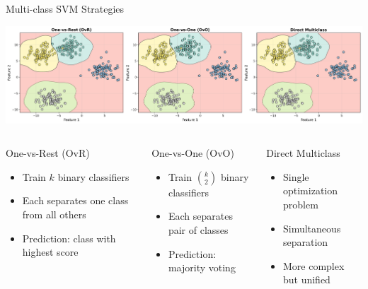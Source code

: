 \documentclass[8pt,aspectratio=1610]{beamer}
\begin{document}
\begin{frame}{Multi-class SVM Strategies}
\begin{center}
\includegraphics[width=\textwidth]{../figures/multiclass_strategies.png}
\end{center}

\begin{columns}[t]
\begin{column}{0.32\textwidth}
\begin{block}{One-vs-Rest (OvR)}
\begin{itemize}
\setlength{\itemsep}{1pt}
\item Train $k$ binary classifiers
\item Each separates one class from all others
\item Prediction: class with highest score
\end{itemize}
\end{block}
\end{column}

\begin{column}{0.32\textwidth}
\begin{block}{One-vs-One (OvO)}
\begin{itemize}
\setlength{\itemsep}{1pt}
\item Train $\binom{k}{2}$ binary classifiers
\item Each separates pair of classes
\item Prediction: majority voting
\end{itemize}
\end{block}
\end{column}

\begin{column}{0.32\textwidth}
\begin{block}{Direct Multiclass}
\begin{itemize}
\setlength{\itemsep}{1pt}
\item Single optimization problem
\item Simultaneous separation
\item More complex but unified
\end{itemize}
\end{block}
\end{column}
\end{columns}
\end{frame}
\end{document}
